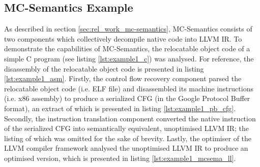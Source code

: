 
\subsection{MC-Semantics Example}
\label{app:mc-semantics_example}

As described in section \ref{sec:rel_work_mc-semantics}, MC-Semantics consists of two components which collectively decompile native code into LLVM IR. To demonstrate the capabilities of MC-Semantics, the relocatable object code of a simple C program (see listing \ref{lst:example1_c}) was analysed. For reference, the disassembly of the relocatable object code is presented in listing \ref{lst:example1_asm}. Firstly, the control flow recovery component parsed the relocatable object code (i.e. ELF file) and disassembled its machine instructions (i.e. x86 assembly) to produce a serialized CFG (in the Google Protocol Buffer format), an extract of which is presented in listing \ref{lst:example1_pb_cfg}. Secondly, the instruction translation component converted the native instruction of the serialized CFG into semantically equivalent, unoptimised LLVM IR; the listing of which was omitted for the sake of brevity. Lastly, the optimiser of the LLVM compiler framework analysed the unoptimised LLVM IR to produce an optimised version, which is presented in listing \ref{lst:example1_mcsema_ll}.






